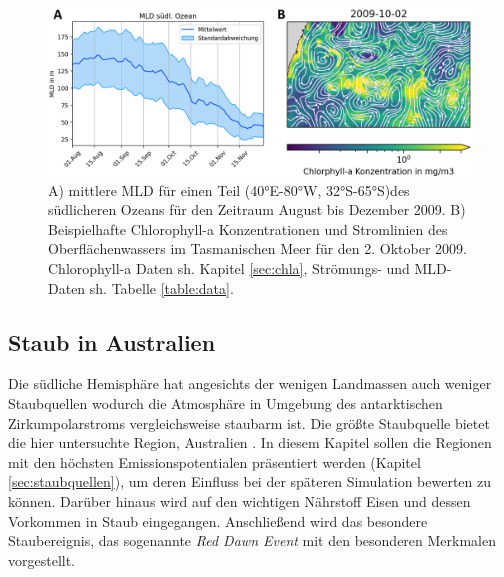 \documentclass[12pt,a4paper,onecolumn,headheight=30pt]{scrartcl}
\begin{document}
\begin{figure}[htbp]
\includegraphics[width=\textwidth]{bilder/mld_currents.png}
\caption{A) mittlere MLD für einen Teil (40°E-80°W, 32°S-65°S)des südlicheren Ozeans für den Zeitraum August bis Dezember 2009. B) Beispielhafte Chlorophyll-a Konzentrationen und Stromlinien des Oberflächenwassers im Tasmanischen Meer für den 2. Oktober 2009. Chlorophyll-a Daten sh. Kapitel \ref{sec:chla}, Strömungs- und MLD-Daten sh. Tabelle \ref{table:data}.} \label{fig:mld_currents}
\end{figure}
\subsection{Staub in Australien} \label{sec:Staub}
Die südliche Hemisphäre hat angesichts der wenigen Landmassen auch weniger Staubquellen wodurch die Atmosphäre in Umgebung des antarktischen Zirkumpolarstroms vergleichsweise staubarm ist. Die größte Staubquelle bietet die hier untersuchte Region, Australien \citep{Shao.2011}. In diesem Kapitel sollen die Regionen mit den höchsten Emissionspotentialen präsentiert werden (Kapitel \ref{sec:staubquellen}), um deren Einfluss bei der späteren Simulation bewerten zu können. Darüber hinaus wird auf den wichtigen Nährstoff Eisen und dessen Vorkommen in Staub eingegangen. Anschließend wird das besondere Staubereignis, das sogenannte \textit{Red Dawn Event} mit den besonderen Merkmalen vorgestellt.
\end{document}
